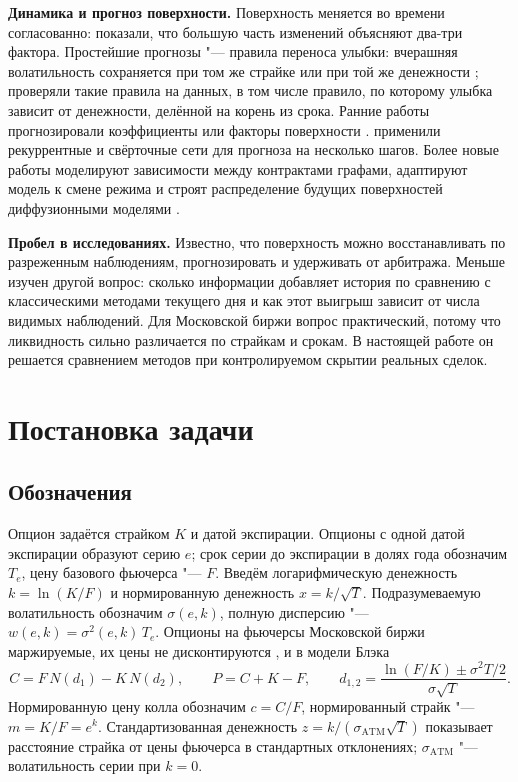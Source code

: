 \documentclass{article}
\begin{document}
\textbf{Динамика и прогноз поверхности.}
Поверхность меняется во времени согласованно: \citet{cont2002dynamics} показали, что большую часть изменений объясняют два-три фактора. Простейшие прогнозы "--- правила переноса улыбки: вчерашняя волатильность сохраняется при том же страйке или при той же денежности \citep{derman1999regimes}; \citet{daglish2007volatility} проверяли такие правила на данных, в том числе правило, по которому улыбка зависит от денежности, делённой на корень из срока. Ранние работы прогнозировали коэффициенты или факторы поверхности \citep{goncalves2006predictable,chen2016kalman}. \citet{medvedev2022multistep} применили рекуррентные и свёрточные сети для прогноза на несколько шагов. Более новые работы моделируют зависимости между контрактами графами, адаптируют модель к смене режима \citep{zhuang2026continual} и строят распределение будущих поверхностей диффузионными моделями \citep{jin2025diffusion,buchegger2026arbitrage}.

\textbf{Пробел в исследованиях.}
Известно, что поверхность можно восстанавливать по разреженным наблюдениям, прогнозировать и удерживать от арбитража. Меньше изучен другой вопрос: сколько информации добавляет история по сравнению с классическими методами текущего дня и как этот выигрыш зависит от числа видимых наблюдений. Для Московской биржи вопрос практический, потому что ликвидность сильно различается по страйкам и срокам. В настоящей работе он решается сравнением методов при контролируемом скрытии реальных сделок.

\section{Постановка задачи}\label{sec:problem}

\subsection{Обозначения}

Опцион задаётся страйком $K$ и датой экспирации. Опционы с одной датой экспирации образуют серию $e$; срок серии до экспирации в долях года обозначим $T_e$, цену базового фьючерса "--- $F$. Введём логарифмическую денежность $k=\ln(K/F)$ и нормированную денежность $x=k/\sqrt{T}$. Подразумеваемую волатильность обозначим $\sigma(e,k)$, полную дисперсию "--- $w(e,k)=\sigma^2(e,k)\,T_e$. Опционы на фьючерсы Московской биржи маржируемые, их цены не дисконтируются \citep{moex2024theor}, и в модели Блэка \citep{black1976pricing}
\begin{equation}\label{eq:black}
C = F\,N(d_1) - K\,N(d_2), \qquad P = C + K - F, \qquad d_{1,2} = \frac{\ln(F/K) \pm \sigma^2 T/2}{\sigma\sqrt{T}}.
\end{equation}
Нормированную цену колла обозначим $c=C/F$, нормированный страйк "--- $m=K/F=e^{k}$. Стандартизованная денежность $z=k/(\sigma_{\mathrm{ATM}}\sqrt{T})$ показывает расстояние страйка от цены фьючерса в стандартных отклонениях; $\sigma_{\mathrm{ATM}}$ "--- волатильность серии при $k=0$.
\end{document}
